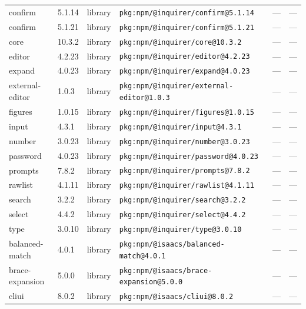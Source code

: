 \documentclass[11pt,a4paper]{article}
\begin{document}
\begin{longtable}{|p{4cm}|p{2cm}|p{1.6cm}|p{5cm}|p{1.5cm}|p{3.5cm}|}
\raggedright confirm & 5.1.14 & library & \small\texttt{pkg:npm/@inquirer/confirm@5.1.14} & — & \small — \\
\raggedright confirm & 5.1.21 & library & \small\texttt{pkg:npm/@inquirer/confirm@5.1.21} & — & \small — \\
\raggedright core & 10.3.2 & library & \small\texttt{pkg:npm/@inquirer/core@10.3.2} & — & \small — \\
\raggedright editor & 4.2.23 & library & \small\texttt{pkg:npm/@inquirer/editor@4.2.23} & — & \small — \\
\raggedright expand & 4.0.23 & library & \small\texttt{pkg:npm/@inquirer/expand@4.0.23} & — & \small — \\
\raggedright external-editor & 1.0.3 & library & \small\texttt{pkg:npm/@inquirer/external-editor@1.0.3} & — & \small — \\
\raggedright figures & 1.0.15 & library & \small\texttt{pkg:npm/@inquirer/figures@1.0.15} & — & \small — \\
\raggedright input & 4.3.1 & library & \small\texttt{pkg:npm/@inquirer/input@4.3.1} & — & \small — \\
\raggedright number & 3.0.23 & library & \small\texttt{pkg:npm/@inquirer/number@3.0.23} & — & \small — \\
\raggedright password & 4.0.23 & library & \small\texttt{pkg:npm/@inquirer/password@4.0.23} & — & \small — \\
\raggedright prompts & 7.8.2 & library & \small\texttt{pkg:npm/@inquirer/prompts@7.8.2} & — & \small — \\
\raggedright rawlist & 4.1.11 & library & \small\texttt{pkg:npm/@inquirer/rawlist@4.1.11} & — & \small — \\
\raggedright search & 3.2.2 & library & \small\texttt{pkg:npm/@inquirer/search@3.2.2} & — & \small — \\
\raggedright select & 4.4.2 & library & \small\texttt{pkg:npm/@inquirer/select@4.4.2} & — & \small — \\
\raggedright type & 3.0.10 & library & \small\texttt{pkg:npm/@inquirer/type@3.0.10} & — & \small — \\
\raggedright balanced-match & 4.0.1 & library & \small\texttt{pkg:npm/@isaacs/balanced-match@4.0.1} & — & \small — \\
\raggedright brace-expansion & 5.0.0 & library & \small\texttt{pkg:npm/@isaacs/brace-expansion@5.0.0} & — & \small — \\
\raggedright cliui & 8.0.2 & library & \small\texttt{pkg:npm/@isaacs/cliui@8.0.2} & — & \small — \\

\end{longtable}
\end{document}
